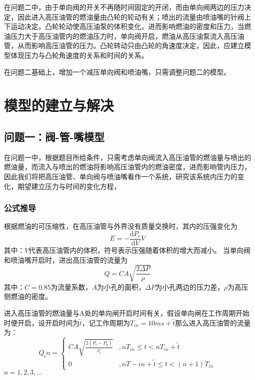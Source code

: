 \documentclass[withoutpreface,bwprint]{cumcmthesis} %
\begin{document}
在问题二中，由于单向阀的开关不再随时间固定的开闭，而由单向阀两边的压力决定，因此进入高压油管的燃油量由凸轮的轮动有关；喷出的流量由喷油嘴的针阀上下运动决定。凸轮轮动使高压油泵的体积变化，进而影响燃油的密度和压力，当燃油压力大于高压油管内的燃油压力时，单向阀开启，燃油从高压油泵流入高压油管，从而影响高压油管的压力。凸轮转动只由凸轮的角速度决定，因此，应建立模型体现压力与凸轮角速度的关系和时间的关系。


在问题二基础上，增加一个减压单向阀和喷油嘴，只需调整问题二的模型。

 
\section{模型的建立与解决}
\subsection{问题一：阀-管-嘴模型}
在问题一中，根据题目所给条件，只需考虑单向阀流入高压油管的燃油量与喷出的燃油量，而流入与喷出的燃油将影响高压油管内的燃油密度，进而影响管内压力，因此我们将把高压油管、单向阀与喷油嘴看作一个系统，研究该系统内压力的变化，期望建立压力与时间的变化方程，
\subsubsection{公式推导}
根据燃油的可压缩性，在高压油管与外界没有质量交换时，其内的压强变化为
\begin{equation}
	E = -\frac{\mathrm{d}P_c}{\mathrm{d}V}V
\end{equation}
其中：$V$代表高压油管内的体积，符号表示压强随着体积的增大而减小。
当单向阀和喷油嘴开启时，进出高压油管的流量为
\begin{equation}
	Q = CA\sqrt{\frac{2\Delta P}{\rho}}
\end{equation}
其中：$C = 0.85$为流量系数，$A$为小孔的面积，$\Delta P$为小孔两边的压力差，$\rho$为高压侧燃油的密度。

进入高压油管的燃油量与A处的单向闸开启时间有关，假设单向闸在工作周期开始时便开启，设开启时间为$\widetilde{t}$，记工作周期为$T_{in} = 10ms + \widetilde{t}$那么进入高压油管的流量为：
\begin{equation}
	Q_in = \left\{ 
	\begin{array}{ll}
	CA\sqrt{\frac{2(P_c-P_p)}{\rho_c}}&,nT_{in}\leq t <nT_{in} + \widetilde{t} \\
	0&,nT
	-{in}+\widetilde{t}\leq t <(n+1)T_{in}
	\end{array}
	\right.
\end{equation}
$n = 1,2,3,...$
\end{document}
